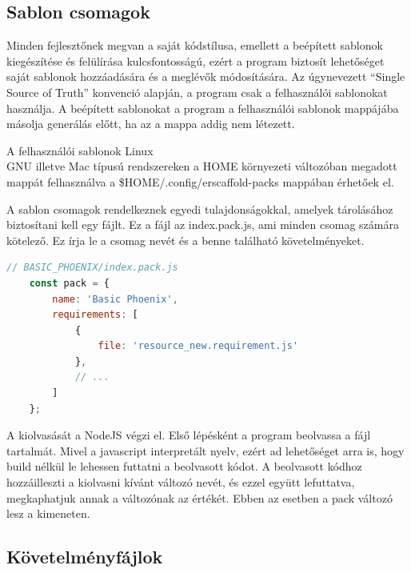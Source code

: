 \documentclass[a4paper,12pt,oneside]{report}
\begin{document}
\newpage
\subsection{Sablon csomagok}

\begin{justify}

	Minden fejlesztőnek megvan a saját kódstílusa, emellett a beépített sablonok kiegészítése és felülírása kulcsfontosságú, ezért a program biztosít lehetőséget saját sablonok hozzáadására és a meglévők módosítására. Az úgynevezett “Single Source of Truth” konvenció alapján, a program csak a felhasználói sablonokat használja. A beépített sablonokat a program a felhasználói sablonok mappájába másolja generálás előtt, ha az a mappa addig nem létezett.

	A felhasználói sablonok Linux\\GNU illetve Mac típusú rendszereken a HOME környezeti változóban megadott mappát felhasználva a \$HOME/.config/erscaffold-packs mappában érhetőek el. 

	A sablon csomagok rendelkeznek egyedi tulajdonságokkal, amelyek tárolásához biztosítani kell egy fájlt. Ez a fájl az index.pack.js, ami minden csomag számára kötelező. Ez írja le a csomag nevét és a benne található követelményeket.

	\begin{lstlisting}[language=javascript]
	// BASIC_PHOENIX/index.pack.js
	const pack = {
		name: 'Basic Phoenix',
		requirements: [
			{
				file: 'resource_new.requirement.js'
			},
			// ...
		]
	};
	\end{lstlisting}

	A kiolvasását a NodeJS végzi el. Első lépésként a program beolvassa a fájl tartalmát. Mivel a javascript interpretált nyelv, ezért ad lehetőséget arra is, hogy build nélkül le lehessen futtatni a beolvasott kódot. A beolvasott kódhoz hozzáilleszti a kiolvasni kívánt változó nevét, és ezzel együtt lefuttatva, megkaphatjuk annak a változónak az értékét. Ebben az esetben a pack változó lesz a kimeneten.  

\end{justify}

\newpage
\subsection{Követelményfájlok}
\end{document}
